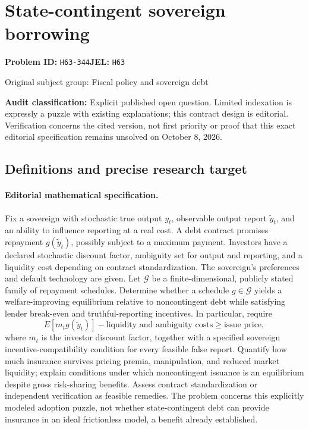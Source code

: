 \documentclass[11pt,a4paper]{article}
\begin{document}
\section*{State-contingent sovereign borrowing}
\textbf{Problem ID:} \texttt{H63-344}\quad \textbf{JEL:} \texttt{H63}\par
\label{problem:OP-0258}
{\sffamily\small\color{muted}Original subject group: Fiscal policy and sovereign debt\par}
\label{definitions:problem:30007539}
\textbf{Audit classification:} Explicit published open question. Limited indexation is expressly a puzzle with existing explanations; this contract design is editorial. Verification concerns the cited version, not first priority or proof that this exact editorial specification remains unsolved on October 8, 2026.
\subsection*{Definitions and precise research target}
\paragraph{Editorial mathematical specification.} Fix a sovereign with stochastic true output \(y_t\), observable output report \(\tilde y_t\), and an ability to influence reporting at a real cost. A debt contract promises repayment \(g(\tilde y_t)\), possibly subject to a maximum payment. Investors have a declared stochastic discount factor, ambiguity set for output and reporting, and a liquidity cost depending on contract standardization. The sovereign’s preferences and default technology are given. Let \(\mathcal G\) be a finite-dimensional, publicly stated family of repayment schedules.
Determine whether a schedule \(g\in\mathcal G\) yields a welfare-improving equilibrium relative to noncontingent debt while satisfying lender break-even and truthful-reporting incentives. In particular, require
\[
E[m_t g(\tilde y_t)]-\text{liquidity and ambiguity costs}\ge \text{issue price},
\]
where \(m_t\) is the investor discount factor, together with a specified sovereign incentive-compatibility condition for every feasible false report. Quantify how much insurance survives pricing premia, manipulation, and reduced market liquidity; explain conditions under which noncontingent issuance is an equilibrium despite gross risk-sharing benefits. Assess contract standardization or independent verification as feasible remedies. The problem concerns this explicitly modeled adoption puzzle, not whether state-contingent debt can provide insurance in an ideal frictionless model, a benefit already established.
\end{document}
